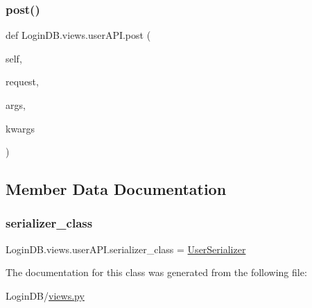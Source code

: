\subsubsection{\texorpdfstring{post()}{post()}}
{\footnotesize\ttfamily def Login\+D\+B.\+views.\+user\+A\+P\+I.\+post (\begin{DoxyParamCaption}\item[{}]{self,  }\item[{}]{request,  }\item[{}]{args,  }\item[{}]{kwargs }\end{DoxyParamCaption})}



\subsection{Member Data Documentation}
\mbox{\label{class_login_d_b_1_1views_1_1user_a_p_i_a36df7af9befe6a85192da7694a68c0e2}} 
\subsubsection{\texorpdfstring{serializer\+\_\+class}{serializer\_class}}
{\footnotesize\ttfamily Login\+D\+B.\+views.\+user\+A\+P\+I.\+serializer\+\_\+class = \hyperlink{class_login_d_b_1_1serializers_1_1_user_serializer}{User\+Serializer}\hspace{0.3cm}{\ttfamily [static]}}



The documentation for this class was generated from the following file\+:\begin{DoxyCompactItemize}
\item 
Login\+D\+B/\hyperlink{views_8py}{views.\+py}\end{DoxyCompactItemize}
